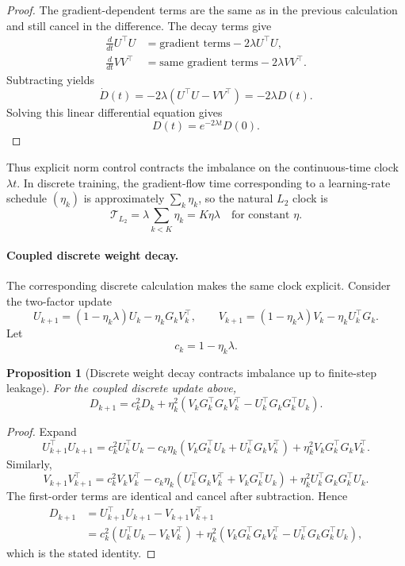 \documentclass{article}
\newtheorem{proposition}{Proposition}
\begin{document}
\begin{proof}
The gradient-dependent terms are the same as in the previous
calculation and still cancel in the difference.  The decay terms give
\[
\begin{aligned}
    \frac{d}{dt}U^\top U
    &=
    \text{gradient terms}
    -2\lambda U^\top U,
    \\
    \frac{d}{dt}VV^\top
    &=
    \text{same gradient terms}
    -2\lambda VV^\top .
\end{aligned}
\]
Subtracting yields
\[
    \dot D(t)
    =
    -2\lambda
    \left(
        U^\top U - VV^\top
    \right)
    =
    -2\lambda D(t).
\]
Solving this linear differential equation gives
\[
    D(t)=e^{-2\lambda t}D(0).
\]
\end{proof}

Thus explicit norm control contracts the imbalance on the continuous-time
clock \(\lambda t\).  In discrete training, the gradient-flow time
corresponding to a learning-rate schedule \((\eta_k)\) is
approximately \(\sum_k \eta_k\), so the natural \(L_2\) clock is
\[
    \mathcal T_{L_2}
    =
    \lambda \sum_{k<K}\eta_k
    =
    K\eta\lambda
    \quad\text{for constant \(\eta\)}.
\]

\paragraph{Coupled discrete weight decay.}
The corresponding discrete calculation makes the same clock explicit.
Consider the two-factor update
\[
    U_{k+1}
    =
    (1-\eta_k\lambda)U_k-\eta_kG_kV_k^\top,
    \qquad
    V_{k+1}
    =
    (1-\eta_k\lambda)V_k-\eta_kU_k^\top G_k.
\]
Let
\[
    c_k=1-\eta_k\lambda.
\]

\begin{proposition}[Discrete weight decay contracts imbalance up to finite-step leakage]
For the coupled discrete update above,
\[
    D_{k+1}
    =
    c_k^2D_k
    +
    \eta_k^2
    \left(
        V_kG_k^\top G_kV_k^\top
        -
        U_k^\top G_kG_k^\top U_k
    \right).
\]
\end{proposition}

\begin{proof}
Expand
\[
    U_{k+1}^\top U_{k+1}
    =
    c_k^2U_k^\top U_k
    -
    c_k\eta_k
    \left(
        V_kG_k^\top U_k
        +
        U_k^\top G_kV_k^\top
    \right)
    +
    \eta_k^2V_kG_k^\top G_kV_k^\top .
\]
Similarly,
\[
    V_{k+1}V_{k+1}^\top
    =
    c_k^2V_kV_k^\top
    -
    c_k\eta_k
    \left(
        U_k^\top G_kV_k^\top
        +
        V_kG_k^\top U_k
    \right)
    +
    \eta_k^2U_k^\top G_kG_k^\top U_k .
\]
The first-order terms are identical and cancel after subtraction.  Hence
\[
\begin{aligned}
    D_{k+1}
    &=
    U_{k+1}^\top U_{k+1}
    -
    V_{k+1}V_{k+1}^\top \\
    &=
    c_k^2
    \left(
        U_k^\top U_k-V_kV_k^\top
    \right)
    +
    \eta_k^2
    \left(
        V_kG_k^\top G_kV_k^\top
        -
        U_k^\top G_kG_k^\top U_k
    \right),
\end{aligned}
\]
which is the stated identity.
\end{proof}
\end{document}
